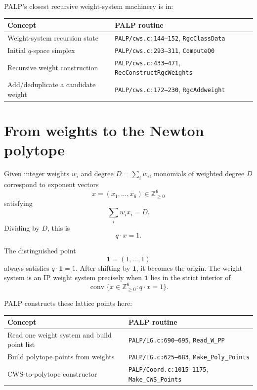 \documentclass[11pt]{article}
\begin{document}
PALP's closest recursive weight-system machinery is in:

\begin{center}
\begin{tabular}{@{}ll@{}}
\toprule
Concept & PALP routine \\
\midrule
Weight-system recursion state & \texttt{PALP/cws.c:144--152}, \texttt{RgcClassData} \\
Initial \(q\)-space simplex & \texttt{PALP/cws.c:293--311}, \texttt{ComputeQ0} \\
Recursive weight construction & \texttt{PALP/cws.c:433--471}, \texttt{RecConstructRgcWeights} \\
Add/deduplicate a candidate weight & \texttt{PALP/cws.c:172--230}, \texttt{RgcAddweight} \\
\bottomrule
\end{tabular}
\end{center}

\section{From weights to the Newton polytope}

Given integer weights \(w_i\) and degree \(D=\sum_i w_i\), monomials of weighted degree \(D\) correspond to exponent vectors
\[
x=(x_1,\dots,x_6)\in\mathbb Z_{\ge0}^6
\]
satisfying
\[
\sum_i w_i x_i=D.
\]
Dividing by \(D\), this is
\[
q\cdot x=1.
\]

The distinguished point
\[
\mathbf 1=(1,\dots,1)
\]
always satisfies \(q\cdot\mathbf1=1\). After shifting by \(\mathbf1\), it becomes the origin. The weight system is an IP weight system precisely when \(\mathbf1\) lies in the strict interior of
\[
\operatorname{conv}\{x\in\mathbb Z_{\ge0}^6:q\cdot x=1\}.
\]

PALP constructs these lattice points here:

\begin{center}
\begin{tabular}{@{}ll@{}}
\toprule
Concept & PALP routine \\
\midrule
Read one weight system and build point list & \texttt{PALP/LG.c:690--695}, \texttt{Read\_W\_PP} \\
Build polytope points from weights & \texttt{PALP/LG.c:625--683}, \texttt{Make\_Poly\_Points} \\
CWS-to-polytope constructor & \texttt{PALP/Coord.c:1015--1175}, \texttt{Make\_CWS\_Points} \\
\bottomrule
\end{tabular}
\end{center}
\end{document}

